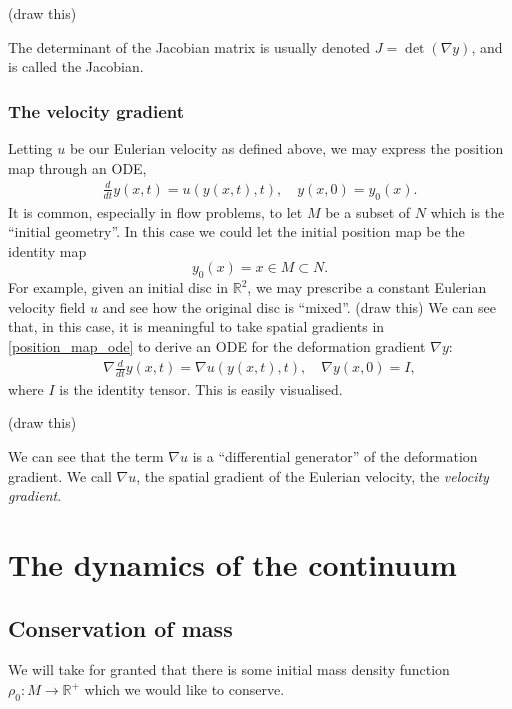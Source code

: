 \documentclass[11pt,a4paper]{memoir}
\begin{document}
\vskip 0.2in
(draw this)
\vskip 0.2in

The determinant of the Jacobian matrix is usually denoted $J = \det(\nabla y)$, and is called the Jacobian.

\subsubsection{The velocity gradient}
Letting $u$ be our Eulerian velocity as defined above, we may express the position map through an ODE,
\begin{equation}\label{position_map_ode}
\begin{split}
    \frac{d}{dt} y(x, t) = u(y(x, t), t),\quad
    y(x, 0) = y_0(x).
\end{split}
\end{equation}
It is common, especially in flow problems, to let $M$ be a subset of $N$ which is the ``initial geometry''.
In this case we could let the initial position map be the identity map
    $$y_0(x) = x \in M \subset N.$$
For example, given an initial disc in $\mathbb{R}^2$, we may prescribe a constant Eulerian velocity field $u$ and
see how the original disc is ``mixed''.
\vskip 0.2in
(draw this)
\vskip 0.2in
We can see that, in this case, it is meaningful to take spatial gradients in \eqref{position_map_ode} to derive an ODE for the deformation gradient $\nabla y$:
\begin{equation}\label{deformation_gradient_ode}
\begin{split}
    \nabla \frac{d}{dt} y(x, t) = \nabla u(y(x, t), t),\quad
    \nabla y(x, 0) = I,
\end{split}
\end{equation}
where $I$ is the identity tensor. This is easily visualised.

\vskip 0.2in
(draw this)
\vskip 0.2in

We can see that the term $\nabla u$ is a ``differential generator'' of the deformation gradient.
We call $\nabla u$, the spatial gradient of the Eulerian velocity, the \textit{velocity gradient}.


\section{The dynamics of the continuum}

\subsection{Conservation of mass}
We will take for granted that there is some initial mass density function $\rho_0:M\rightarrow \mathbb{R}^+$
which we would like to conserve.
\end{document}
